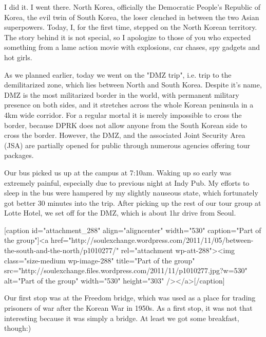 \begin{post}
	\begin{content}
I did it. I went there. North Korea, officially the Democratic People's Republic of Korea, the evil twin of South Korea, the loser clenched in between the two Asian superpowers. Today, I, for the first time, stepped on the North Korean territory. The story behind it is not special, so I apologize to those of you who expected something from a lame action movie with explosions, car chases, spy gadgets and hot girls.



As we planned earlier, today we went on the "DMZ trip", i.e. trip to the demilitarized zone, which lies between North and South Korea. Despite it's name, DMZ is the most militarized border in the world, with permanent military presence on both sides, and it stretches across the whole Korean peninsula in a 4km wide corridor. For a regular mortal it is merely impossible to cross the border, because DPRK does not allow anyone from the South Korean side to cross the border. However, the DMZ, and the associated Joint Security Area (JSA) are partially opened for public through numerous agencies offering tour packages.



Our bus picked us up at the campus at 7:10am. Waking up so early was extremely painful, especially due to previous night at Indy Pub. My efforts to sleep in the bus were hampered by my slightly nauseous state, which fortunately got better 30 minutes into the trip. After picking up the rest of our tour group at Lotte Hotel, we set off for the DMZ, which is about 1hr drive from Seoul.



[caption id="attachment_288" align="aligncenter" width="530" caption="Part of the group"]<a href="http://soulexchange.wordpress.com/2011/11/05/between-the-south-and-the-north/p1010277/" rel="attachment wp-att-288"><img class="size-medium wp-image-288" title="Part of the group" src="http://soulexchange.files.wordpress.com/2011/11/p1010277.jpg?w=530" alt="Part of the group" width="530" height="303" /></a>[/caption]



Our first stop was at the Freedom bridge, which was used as a place for trading prisoners of war after the Korean War in 1950s. As a first stop, it was not that interesting because it was simply a bridge. At least we got some breakfast, though:)


\end{content}
\end{post}
